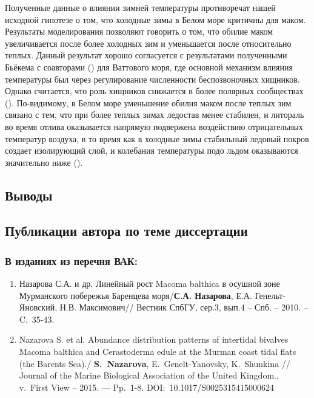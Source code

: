 {{Полученные данные о влиянии зимней температуры противоречат нашей исходной гипотезе о том, что холодные зимы в Белом море критичны для маком. 
Результаты моделирования позволяют говорить о том, что обилие маком увеличивается после более холодных зим и уменьшается после относительно теплых. 
Данный результат хорошо согласуется с результатами полученными Бьёкема с соавторами (\cite{Beukema_et_al_1998, Beukema_et_al_2009}) для Ваттового моря, где основной механизм влияния температуры был через регулирование численности беспозвоночных хищников.  
Однако считается, что роль хищников снижается в более полярных сообществах (\cite{Pianka_1966, Freestone_et_al_2011}). 
По-видимому, в Белом море уменьшение обилия маком после теплых зим связано с тем, что при более теплых зимах ледостав менее стабилен, и литораль во время отлива оказывается напрямую подвержена воздействию отрицательных температур воздуха, в то время как в холодные зимы стабильный ледовый покров создает изолирующий слой, и колебания температуры подо льдом оказываются значительно ниже (\cite{Kuznecov_1960}).
%

\subsection*{Выводы}


\begin{small}
\section*{Публикации автора по теме диссертации}
\subsubsection*{В изданиях из перечня ВАК:}
\begin{enumerate}
\item Назарова С.А. и др. Линейный рост Macoma balthica в осушной зоне Мурманского побережья Баренцева моря/\textbf{С.А. Назарова}, Е.А.  Генельт-Яновский,  Н.В. Максимович// Вестник СпбГУ, сер.3, вып.4 -- Спб. -- 2010. -- C.~35-43.
\item  Nazarova S. et al. Abundance distribution patterns of intertidal bivalves Macoma balthica and Cerastoderma edule at the Murman coast tidal flats (the Barents Sea)./ \textbf{S.~Nazarova}, E.~Genelt-Yanovsky, K.~Shunkina // Journal of the Marine Biological Association of the United Kingdom., v.~First View -- 2015. — Pp.~1-8. DOI:~10.1017/S0025315415000624
\end{enumerate}


\end{small}}}

